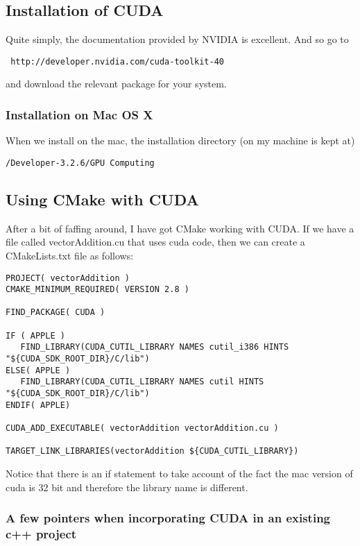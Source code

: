 \documentclass[a4paper, 10pt]{article}
\begin{document}
\subsection*{Installation of CUDA}

Quite simply, the documentation provided by NVIDIA is excellent. And so go to
\begin{verbatim}
 http://developer.nvidia.com/cuda-toolkit-40
 \end{verbatim}
and download the relevant package for your system.

\subsubsection*{Installation on Mac OS X}
\label{sec:installation-mac-os}

When we install on the mac, the installation directory (on my machine
is kept at)
\begin{verbatim}
/Developer-3.2.6/GPU Computing
\end{verbatim}

\subsection*{Using CMake with CUDA}
\label{sec:using-cmake-with}

After a bit of faffing around, I have got CMake working with CUDA. If
we have a file called vectorAddition.cu that uses cuda code, then we
can create a CMakeLists.txt file as follows:

\begin{verbatim}
PROJECT( vectorAddition )
CMAKE_MINIMUM_REQUIRED( VERSION 2.8 )

FIND_PACKAGE( CUDA )

IF ( APPLE )
   FIND_LIBRARY(CUDA_CUTIL_LIBRARY NAMES cutil_i386 HINTS "${CUDA_SDK_ROOT_DIR}/C/lib")
ELSE( APPLE )
   FIND_LIBRARY(CUDA_CUTIL_LIBRARY NAMES cutil HINTS "${CUDA_SDK_ROOT_DIR}/C/lib")
ENDIF( APPLE) 

CUDA_ADD_EXECUTABLE( vectorAddition vectorAddition.cu )

TARGET_LINK_LIBRARIES(vectorAddition ${CUDA_CUTIL_LIBRARY})
\end{verbatim}

Notice that there is an if statement to take account of the fact the
mac version of cuda is 32 bit and therefore the library name is
different. 

\subsubsection*{A few pointers when incorporating CUDA in an existing c++ project}
\label{sec:few-pointers-when}
\end{document}

